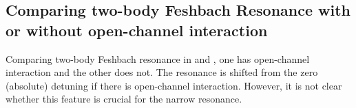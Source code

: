 \subsection{Comparing two-body Feshbach Resonance with or without open-channel interaction }
Comparing two-body Feshbach resonance in \cite{Leggett} and \cite{GurarieNarrow}, one has open-channel interaction and the other does not.  The resonance is shifted from the zero (absolute) detuning if there is open-channel interaction.  However, it is not clear whether this feature is crucial for the narrow resonance.   
